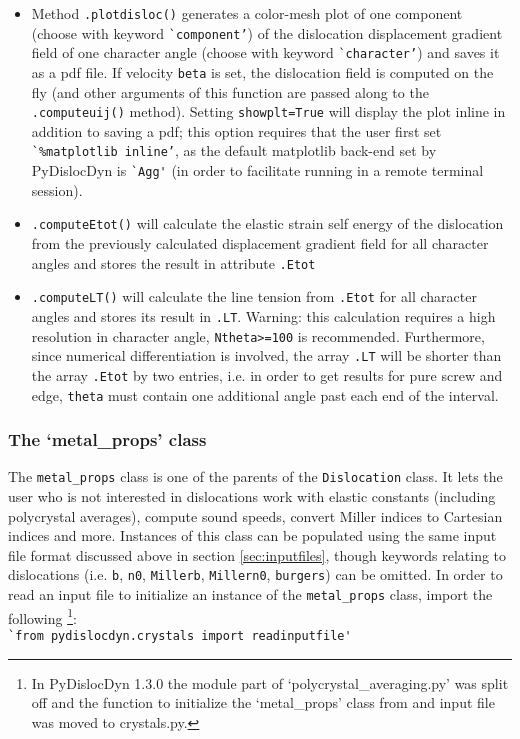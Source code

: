 \documentclass[11pt,letterpaper,oneside,pdftex]{article}
\begin{document}
\begin{itemize}
\item Method \verb|.plotdisloc()| generates a color-mesh plot of one component (choose with keyword \verb|`component’|) of the dislocation displacement gradient field of one character angle (choose with keyword \verb|`character’|) and saves it as a pdf file.
If velocity \verb|beta| is set, the dislocation field is computed on the fly (and other arguments of this function are passed along to the \verb|.computeuij()| method).
Setting \verb|showplt=True| will display the plot inline in addition to saving a pdf;
this option requires that the user first set \verb|`%matplotlib inline’|, as the default matplotlib back-end set by PyDislocDyn is \verb|`Agg'| (in order to facilitate running in a remote terminal session).

\item \verb|.computeEtot()| will calculate the elastic strain self energy of the dislocation from the previously calculated displacement gradient field for all character angles and stores the result in attribute \verb|.Etot|

\item \verb|.computeLT()| will calculate the line tension from \verb|.Etot| for all character angles and stores its result in \verb|.LT|.
Warning: this calculation requires a high resolution in character angle, \verb|Ntheta>=100| is recommended.
Furthermore, since numerical differentiation is involved, the array \verb|.LT| will be shorter than the array \verb|.Etot| by two entries, i.e. in order to get results for pure screw and edge, \verb|theta| must contain one additional angle past each end of the interval.
\end{itemize}


\subsubsection{The `metal\_props' class}
\label{sec:metal_props}

The \verb|metal_props| class is one of the parents of the \verb|Dislocation| class.
It lets the user who is not interested in dislocations work with elastic constants (including polycrystal averages), compute sound speeds, convert Miller indices to Cartesian indices and more.
Instances of this class can be populated using the same input file format discussed above in section \ref{sec:inputfiles}, though keywords relating to dislocations (i.e. \verb|b|, \verb|n0|, \verb|Millerb|, \verb|Millern0|, \verb|burgers|) can be omitted.
In order to read an input file to initialize an instance of the \verb|metal_props| class, import the following
\footnote{In PyDislocDyn 1.3.0 the module part of `polycrystal\_averaging.py' was split off and the function to initialize the `metal\_props' class from and input file was moved to crystals.py.}:
\\\verb|`from pydislocdyn.crystals import readinputfile'|
\end{document}
